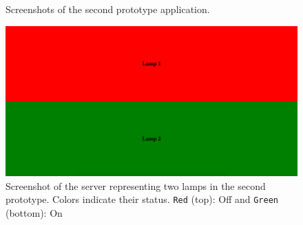 \begin{figure}[!htb]%
    \centering
    \caption{Screenshots of the second prototype application.}
    \label{fig:prototype2-app-screenshots}
\end{figure}

\begin{figure}[!htb]
    \centering
    \includegraphics[scale=0.2]{images/Prototype2_Server.png}
    \caption{Screenshot of the server representing two lamps in the second prototype. Colors indicate their status. \texttt{Red} (top): Off and \texttt{Green} (bottom): On}
    \label{fig:prototype2-server-screenshot}
\end{figure}


